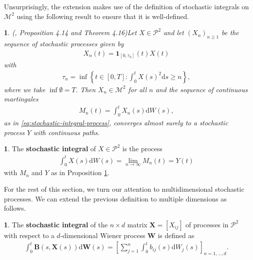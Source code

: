 \documentclass[english]{article}
\numberwithin{equation}{section}
\numberwithin{figure}{section}
\theoremstyle{bolddescit}
\theoremstyle{definition}
\newtheorem{definition}[theorem]{\protect\definitionname}
\theoremstyle{definition}
\theoremstyle{plain}
\theoremstyle{plain}
\theoremstyle{bolddesc}
\theoremstyle{plain}
\newtheorem{proposition}[theorem]{\protect\propositionname}
\theoremstyle{remark}
\providecommand{\definitionname}{Definition}
\providecommand{\propositionname}{Proposition}
\begin{document}
Unsurprisingly, the extension makes use of the definition of stochastic integrals on $\mathcal{M}^2$ using the following result to ensure that it is well-defined.

\begin{proposition}(\cite{capinski_stochastic_2012}, Proposition 4.14 and Theorem 4.16)\label{prop:p2-localising-sequence}
  Let $X \in \mathcal{P}^2$ and let $(X_n)_{n \ge 1}$ be the sequence of stochastic processes given by
  \begin{align*}
    X_n(t) = \mathbf{1}_{[0,\tau_n]}(t) X(t)
  \end{align*}
  with
  \begin{align*}
    \tau_n = \inf \left\{ t \in [0,T] : \int_0^t X(s)^2 \mathrm{d}s \ge n \right\},
  \end{align*}
  where we take $\inf \emptyset = T$.
  Then $X_n \in \mathcal{M}^2$ for all $n$ and the sequence of continuous martingales
  \begin{align*}
    M_n(t) = \int_0^t X_n(s) \mathrm{d}W(s),
  \end{align*}
  as in \eqref{eq:stochastic-integral-process}, converges almost surely to a stochastic process $Y$ with continuous paths.
\end{proposition}

\begin{definition}
  The \textbf{stochastic integral} of $X \in \mathcal{P}^2$ is the process
  \begin{align*}
    \int_0^t X(s) \mathrm{d}W(s) = \lim_{n \to \infty} M_n(t) = Y(t)
  \end{align*}
  with $M_n$ and $Y$ as in Proposition \ref{prop:p2-localising-sequence}.
\end{definition}

For the rest of this section, we turn our attention to multidimensional stochastic processes. We can extend the previous definition to multiple dimensions as follows.

\begin{definition}
  The \textbf{stochastic integral} of the $n \times d$ matrix $\mathbf{X} = [X_{ij}]$ of processes in $\mathcal{P}^2$ with respect to a $d$-dimensional Wiener process $\mathbf{W}$ is defined as
  \begin{align*}
    \int_0^t \mathbf{B}(s,\mathbf{X}(s)) \mathrm{d}\mathbf{W}(s) = \left[
      \sum_{j=1}^{n} \int_0^t b_{ij}(s) \mathrm{d}W_j(s)
    \right]_{n=1,\ldots,d}.
  \end{align*}
\end{definition}
\end{document}

